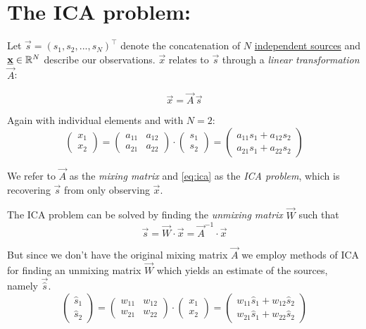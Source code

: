 
\section{The ICA problem:}

Let $\vec s = (s_1, s_2,...,s_N)^\top$ denote the concatenation of $N$ \underline{independent sources} 
and $\underline{\mathbf{x}} \in \mathbb{R}^N$ describe our observations. $\vec x$ relates to $\vec s$ through a 
\emph{linear transformation} $\vec A$:

\begin{equation}
\label{eq:ica}
\vec x = \vec A \, \vec s
\end{equation}

Again with individual elements and with $N=2$:
\begin{equation}
 \left( \begin{array}{ll}
			x_1 \\ x_2
		\end{array} \right)
        = \left( \begin{array}{ll}
			a_{11} & a_{12} \\ a_{21} & a_{22}
		\end{array} \right) \cdot \left( \begin{array}{ll}
			s_1 \\ s_2
		\end{array} \right)
	= \left( \begin{array}{l}
		a_{11} s_1 + a_{12} s_2 \\ a_{21} s_1 + a_{22} s_2
	\end{array} \right)
\end{equation}

We refer to $\vec A$ as the \emph{mixing matrix} and \eqref{eq:ica} as the \emph{ICA problem}, 
which is recovering $\vec s$ from only observing $\vec x$.

The ICA problem can be solved by finding the \emph{unmixing matrix} $\vec W$ such that 
\begin{equation}
\vec s = \vec W \cdot \vec x = \vec A^{-1} \cdot \vec x
\end{equation}

But since we don't have the original mixing matrix $\vec A$ we employ methods of ICA for finding an unmixing matrix $\vec W$ which yields an estimate of the sources, namely $\vec {\hat s}$. 
\begin{equation}
 \left( \begin{array}{ll}
			\hat s_1 \\ \hat s_2
		\end{array} \right)
        = \left( \begin{array}{ll}
			w_{11} & w_{12} \\ w_{21} & w_{22}
		\end{array} \right) \cdot \left( \begin{array}{ll}
			x_1 \\ x_2
		\end{array} \right)
	= \left( \begin{array}{l}
		w_{11} \hat s_1 + w_{12} \hat s_2 \\ w_{21} \hat s_1 + w_{22} \hat s_2
	\end{array} \right)
\end{equation}

